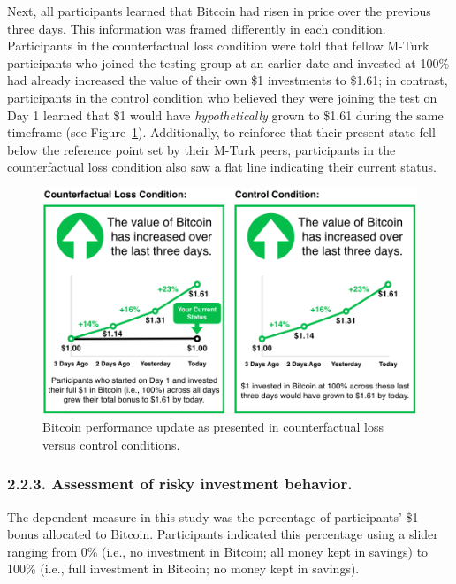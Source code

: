 \documentclass[man,floatsintext]{apa6}
\begin{document}
Next, all participants learned that Bitcoin had risen in price over the previous three days. This information was framed differently in each condition. Participants in the counterfactual loss condition were told that fellow M-Turk participants who joined the testing group at an earlier date and invested at 100\% had already increased the value of their own \$1 investments to \$1.61; in contrast, participants in the control condition who believed they were joining the test on Day 1 learned that \$1 would have \emph{hypothetically} grown to \$1.61 during the same timeframe (see Figure~\ref{fig:manip}). Additionally, to reinforce that their present state fell below the reference point set by their M-Turk peers, participants in the counterfactual loss condition also saw a flat line indicating their current status.

\begin{figure}

{\centering \includegraphics[width=0.9\linewidth,height=0.9\textheight]{../img/manip} 

}

\caption{Bitcoin performance update as presented in counterfactual loss versus control conditions.}\label{fig:manip}
\end{figure}

\hypertarget{assessment-of-risky-investment-behavior.}{%
\subsubsection{2.2.3. Assessment of risky investment behavior.}\label{assessment-of-risky-investment-behavior.}}

The dependent measure in this study was the percentage of participants' \$1 bonus allocated to Bitcoin. Participants indicated this percentage using a slider ranging from 0\% (i.e., no investment in Bitcoin; all money kept in savings) to 100\% (i.e., full investment in Bitcoin; no money kept in savings).
\end{document}
